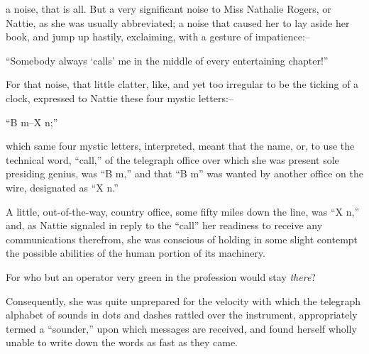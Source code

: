 \newpage
\thispagestyle{empty}
\cleardoublepage

\tableofcontents
\thispagestyle{empty}

\markboth{}{}
\thispagestyle{empty}
\clearpage
\thispagestyle{empty}
\newpage
\clearpage
\thispagestyle{empty}




\begin{center}
\mdash\mintra\mdot\mintra\mdot\mintra\mdot\mword\mdash\mintra\mdash\mword\mdot\mintra\mdash\mintra\mdot\mintra\mdot\mword\mdash\mintra\mdot
\end{center}

 a noise, that is all.\Fparn%
But a very significant noise to Miss Nathalie Rogers, or Nattie, as she
was usually abbreviated; a noise that caused her to lay aside her book,
and jump up hastily, exclaiming, with a gesture of impatience:--

``Somebody always `calls' me in the middle of every entertaining
chapter!''

For that noise, that little clatter, like, and yet too irregular to be
the ticking of a clock, expressed to Nattie these four mystic letters:--

\centerline{ ``B m--X n;'' }

which same four mystic letters, interpreted, meant that the
name, or, to use the technical word, ``call,'' of the telegraph office
over which she was present sole presiding genius, was ``B m,'' and that ``B
m'' was wanted by another office on the wire, designated as ``X n.''

A little, out-of-the-way, country office, some fifty miles down the
line, was ``X n,'' and, as Nattie signaled in reply to the ``call'' her
readiness to receive any communications therefrom, she was conscious of
holding in some slight contempt the possible abilities of the human
portion of its machinery.

For who but an operator very green in the profession would stay \emph{there}?

Consequently, she was quite unprepared for the velocity with which the
telegraph alphabet of sounds in dots and dashes rattled over the
instrument, appropriately termed a ``sounder,'' upon which messages are
received, and found herself wholly unable to write down the words as
fast as they came.

